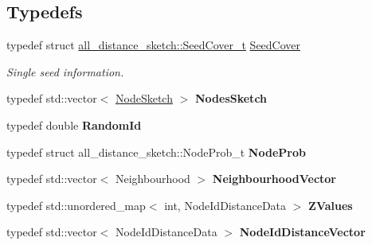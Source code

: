 \subsection*{Typedefs}
\begin{DoxyCompactItemize}
\item 
\hypertarget{namespaceall__distance__sketch_a2c159e46ed1a101b68cb2b23a58c4129}{}typedef struct \hyperlink{structall__distance__sketch_1_1SeedCover__t}{all\+\_\+distance\+\_\+sketch\+::\+Seed\+Cover\+\_\+t} \hyperlink{namespaceall__distance__sketch_a2c159e46ed1a101b68cb2b23a58c4129}{Seed\+Cover}\label{namespaceall__distance__sketch_a2c159e46ed1a101b68cb2b23a58c4129}

\begin{DoxyCompactList}\small\item\em Single seed information. \end{DoxyCompactList}\item 
\hypertarget{namespaceall__distance__sketch_aa6fb9f0cba2c34476603e744606c5d6a}{}typedef std\+::vector$<$ \hyperlink{classall__distance__sketch_1_1NodeSketch}{Node\+Sketch} $>$ {\bfseries Nodes\+Sketch}\label{namespaceall__distance__sketch_aa6fb9f0cba2c34476603e744606c5d6a}

\item 
\hypertarget{namespaceall__distance__sketch_a07dc7ca615a83c4e656f52297eda4bb4}{}typedef double {\bfseries Random\+Id}\label{namespaceall__distance__sketch_a07dc7ca615a83c4e656f52297eda4bb4}

\item 
\hypertarget{namespaceall__distance__sketch_afe1012f59c9acefad48d9c8b254f62da}{}typedef struct all\+\_\+distance\+\_\+sketch\+::\+Node\+Prob\+\_\+t {\bfseries Node\+Prob}\label{namespaceall__distance__sketch_afe1012f59c9acefad48d9c8b254f62da}

\item 
\hypertarget{namespaceall__distance__sketch_a1b6c1bccb4c2618347ee06c820a5ab9d}{}typedef std\+::vector$<$ Neighbourhood $>$ {\bfseries Neighbourhood\+Vector}\label{namespaceall__distance__sketch_a1b6c1bccb4c2618347ee06c820a5ab9d}

\item 
\hypertarget{namespaceall__distance__sketch_a60854de6ec0a7d77c5e111cce0c2f1fd}{}typedef std\+::unordered\+\_\+map$<$ int, Node\+Id\+Distance\+Data $>$ {\bfseries Z\+Values}\label{namespaceall__distance__sketch_a60854de6ec0a7d77c5e111cce0c2f1fd}

\item 
\hypertarget{namespaceall__distance__sketch_a21b129900de9d9cfbb3406f7e0d1a75a}{}typedef std\+::vector$<$ Node\+Id\+Distance\+Data $>$ {\bfseries Node\+Id\+Distance\+Vector}\label{namespaceall__distance__sketch_a21b129900de9d9cfbb3406f7e0d1a75a}


\end{DoxyCompactItemize}
